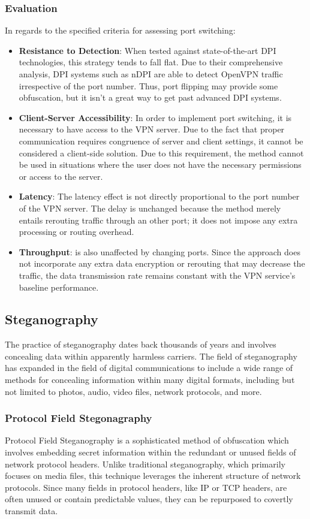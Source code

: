 \documentclass[12pt, fleqn, a4paper]{article}
\begin{document}
\subsubsection{Evaluation}
In regards to the specified criteria for assessing port switching:
\begin{itemize}
\item \textbf{Resistance to Detection}: When tested against state-of-the-art DPI technologies, this strategy tends to fall flat. Due to their comprehensive analysis, DPI systems such as nDPI are able to detect OpenVPN traffic irrespective of the port number. Thus, port flipping may provide some obfuscation, but it isn't a great way to get past advanced DPI systems.
\item \textbf{Client-Server Accessibility}: In order to implement port switching, it is necessary to have access to the VPN server. Due to the fact that proper communication requires congruence of server and client settings, it cannot be considered a client-side solution. Due to this requirement, the method cannot be used in situations where the user does not have the necessary permissions or access to the server.
\item \textbf{Latency}: The latency effect is not directly proportional to the port number of the VPN server. The delay is unchanged because the method merely entails rerouting traffic through an other port; it does not impose any extra processing or routing overhead.
\item \textbf{Throughput}: is also unaffected by changing ports. Since the approach does not incorporate any extra data encryption or rerouting that may decrease the traffic, the data transmission rate remains constant with the VPN service's baseline performance.
\end{itemize}

\subsection{Steganography}
The practice of steganography dates back thousands of years and involves concealing data within apparently harmless carriers. The field of steganography has expanded in the field of digital communications to include a wide range of methods for concealing information within many digital formats, including but not limited to photos, audio, video files, network protocols, and more.
\subsubsection{Protocol Field Stegonagraphy}
Protocol Field Steganography is a sophisticated method of obfuscation which involves embedding secret information within the redundant or unused fields of network protocol headers. Unlike traditional steganography, which primarily focuses on media files, this technique leverages the inherent structure of network protocols. Since many fields in protocol headers, like IP or TCP headers, are often unused or contain predictable values, they can be repurposed to covertly transmit data.
\end{document}
